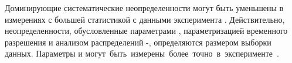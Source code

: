 Доминирующие систематические неопределенности могут быть уменьшены в измерениях с большей статистикой с данными эксперимента \belleii.  Действительно, неопределенности, обусловленные параметрами \ki, параметризацией временного разрешения и анализом распределений \de-\mbc, определяются размером выборки данных.  Параметры \ci и \si могут быть измерены более точно в эксперименте \besiii.

